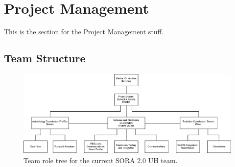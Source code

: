 \section{Project Management}
\label{sec:Management}
This is the section for the Project Management stuff.

\subsection{Team Structure}
\label{sec:Team}

\begin{figure}[H]
\begin{center}
\includegraphics[width=1\textwidth]{./Figures/RoleTree.pdf}
\caption{Team role tree for the current SORA 2.0 UH team.}
\label{fig:role} 
\end{center}
\end{figure}

